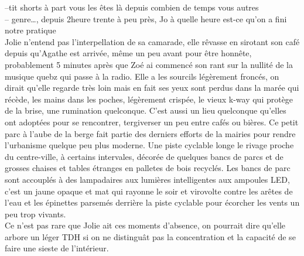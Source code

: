 --tit shorts à part vous les êtes là depuis combien de temps vous
autres\\
-- genre\ldots, depuis 2heure trente à peu près, Jo à quelle
heure est-ce qu'on a fini notre pratique\\

Jolie n'entend pas l'interpellation de sa camarade, elle rêvasse en sirotant
son café depuis qu'Agathe est arrivée, même un peu avant pour être honnête, 
probablement 5 minutes après que Zoé ai commencé son rant sur la nullité
de la musique quebz qui passe à la radio. Elle a les sourcils légèrement
froncés, on dirait qu'elle regarde très loin mais en fait ses yeux sont perdus
dans la marée qui récède, les mains dans les poches, légèrement crispée, le 
vieux k-way qui protège de la brise, une rumination quelconque.
C'est aussi un lieu quelconque qu'elles ont adoptées pour se rencontrer,
tergiverser un peu entre cafés ou bières. Ce petit parc à l'aube de la berge 
fait partie des derniers efforts de la mairies pour rendre l'urbanisme quelque
peu plus moderne. Une piste cyclable longe le rivage proche du
centre-ville, à certains intervales, décorée de quelques bancs de parcs et
de grosses chaises et tables étranges en palletes de bois recyclés. Les bancs
de parc sont accouplés à des lampadaires aux lumières intelligentes aux ampoules
LED, c'est un jaune opaque et mat qui rayonne le soir et virovolte contre les
arêtes de l'eau et les épinettes parsemés derrière la piste cyclable pour
écorcher les vents un peu trop vivants. \\

Ce n'est pas rare que Jolie ait ces moments d'absence, on pourrait dire qu'elle
arbore un léger TDH si on ne distinguât pas la concentration et la capacité
de se faire une sieste de l'intérieur. 


